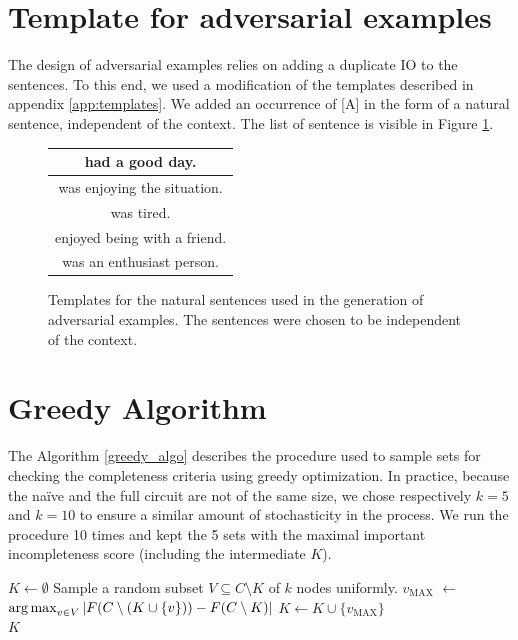 \section{Template for adversarial examples} \label{app:advexes_templates}
The design of adversarial examples relies on adding a duplicate IO to the sentences. To this end, we used a modification of the templates described in appendix \ref{app:templates}. We added an occurrence of [A] in the form of a natural sentence, independent of the context. The list of sentence is visible in Figure \ref{fig:template_advexes}.

\begin{figure}[H]
\centering
\begin{tabular}{ |c| } 
\hline
[A] had a good day.\\
\hline
[A] was enjoying the situation.\\
\hline
[A] was tired.\\
\hline
[A] enjoyed being with a friend.\\
\hline
[A] was an enthusiast person.\\
\hline
\end{tabular}
\caption{Templates for the natural sentences used in the generation of adversarial examples. The sentences were chosen to be independent of the context.}

\label{fig:template_advexes}
\end{figure}
\section{Greedy Algorithm} \label{app:greedy}

The Algorithm \ref{greedy_algo} describes the procedure used to sample sets for checking the completeness criteria using greedy optimization. In practice, because the naïve and the full circuit are not of the same size, we chose respectively $k=5$ and $k=10$ to ensure a similar amount of stochasticity in the process. We run the procedure 10 times and kept the 5 sets with the maximal important incompleteness score (including the intermediate $K$).

\begin{algorithm}
\caption{The greedy sampling procedure for sets to validate the completeness citeria.}\label{greedy_algo}
\begin{algorithmic}[1]
\State $K \gets \emptyset$
    \State Sample a random subset $V \subseteq C\setminus K$ of $k$ nodes uniformly.
    \State $v_{\text{MAX}}$ $\gets$ $\operatorname*{arg\,max}_{v \in V} |F(C \setminus (K \cup \{v\})) - F( C\setminus K)|$
    \State $K \gets K \cup \{v_{\text{MAX}}\}$
\EndFor \\
\Return $K$
\end{algorithmic}
\end{algorithm}


